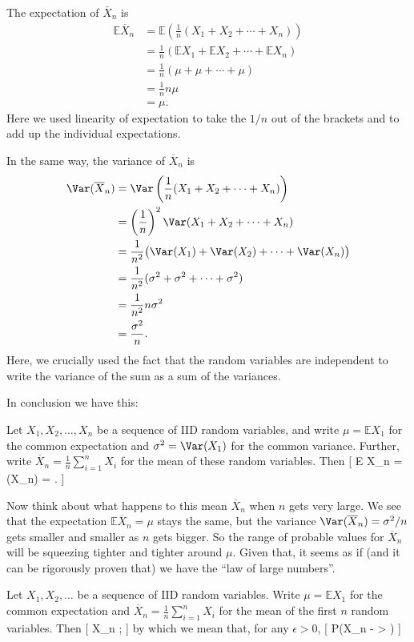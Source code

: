 \documentclass[
  letterpaper,
  DIV=11,
  numbers=noendperiod]{scrreprt}
\theoremstyle{remark}
\begin{document}
The expectation of \(\bar X_n\) is \begin{align*}
\mathbb E \overline X_n &= \mathbb E \left( \frac{1}{n} (X_1 + X_2 + \cdots + X_n)\right) \\
&=   \frac{1}{n} (\mathbb EX_1 + \mathbb EX_2 + \cdots + \mathbb EX_n)\\
&= \frac{1}{n} (\mu + \mu + \cdots + \mu)\\
&= \frac{1}{n} n \mu \\
&= \mu .
\end{align*} Here we used linearity of expectation to take the \(1/n\)
out of the brackets and to add up the individual expectations.

In the same way, the variance of \(\overline X_n\) is \begin{align*}
\Var( \overline X_n) &= \Var \left( \frac{1}{n} (X_1 + X_2 + \cdots + X_n)\right) \\
&= \left(\frac{1}{n}\right)^2 \Var(X_1 + X_2 + \cdots + X_n) \\
&=   \frac{1}{n^2} \big(\Var(X_1) + \Var(X_2) + \cdots + \Var (X_n)\big)\\
&= \frac{1}{n^2} (\sigma^2 + \sigma^2+ \cdots + \sigma^2)\\
&= \frac{1}{n^2} n \sigma^2 \\
&= \frac{\sigma^2}{n} .
\end{align*} Here, we crucially used the fact that the random variables
are independent to write the variance of the sum as a sum of the
variances.

In conclusion we have this:

Let \(X_1, X_2, \dots, X_n\) be a sequence of IID random variables, and
write \(\mu = \mathbb EX_1\) for the common expectation and
\(\sigma^2 = \Var(X_1)\) for the common variance. Further, write
\(\overline X_n =\frac{1}{n} \sum_{i=1}^n X_i\) for the mean of these
random variables. Then {[} \mathbb E \overline X\_n =
\mu \qquad \Var(\overline X\_n) =  . {]}

Now think about what happens to this mean \(\overline X_n\) when \(n\)
gets very large. We see that the expectation
\(\mathbb E\overline X_n = \mu\) stays the same, but the variance
\(\Var(\overline X_n) = \sigma^2/n\) gets smaller and smaller as \(n\)
gets bigger. So the range of probable values for \(\overline X_n\) will
be squeezing tighter and tighter around \(\mu\). Given that, it seems as
if (and it can be rigorously proven that) we have the ``law of large
numbers''.

\leavevmode{}%
Let \(X_1, X_2, \dots\) be a sequence of IID random variables. Write
\(\mu = \mathbb EX_1\) for the common expectation and
\(\overline X_n =\frac{1}{n} \sum_{i=1}^n X_i\) for the mean of the
first \(n\) random variables. Then {[} \overline X\_n
\to \mu \quad {}; {]} by which we
mean that, for any \(\epsilon > 0\), {[}
\mathbb P\big(\textbar{}\overline X\_n - \mu\textbar{} \textgreater{}
\epsilon\big)  \quad {} {]}
\end{document}
